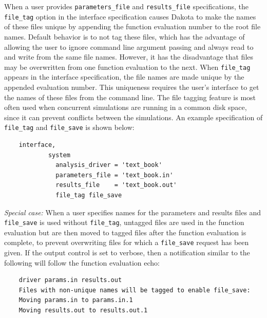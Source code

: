 When a user provides \texttt{parameters\_file} and
\texttt{results\_file} specifications, the \texttt{file\_tag} option
in the interface specification causes Dakota to make the names of
these files unique by appending the function
evaluation number to the root file names. Default behavior is to not
tag these files, which has the advantage of allowing the user to
ignore command line argument passing and always read to and write from
the same file names. However, it has the disadvantage that files may
be overwritten from one function evaluation to the next. When
\texttt{file\_tag} appears in the interface specification, the file names
are made unique by the appended evaluation number. This uniqueness
requires the user's interface to get the names of
these files from the command line. The file tagging feature is most
often used when concurrent simulations are running in a common disk
space, since it can prevent conflicts between the simulations. An
example specification of \texttt{file\_tag} and \texttt{file\_save} is
shown below:
\begin{small}
\begin{verbatim}
    interface,
            system
              analysis_driver = 'text_book'
              parameters_file = 'text_book.in'
              results_file    = 'text_book.out'
              file_tag file_save
\end{verbatim}
\end{small}

\emph{Special case:} When a user specifies names for the parameters
and results files and \texttt{file\_save} is used without
\texttt{file\_tag}, untagged files are used in the function evaluation
but are then moved to tagged files after the function evaluation is
complete, to prevent overwriting files for which a
\texttt{file\_save} request has been given. If the output control is
set to verbose, then a notification similar to the following will
follow the function evaluation echo:
\begin{small}
\begin{verbatim}
    driver params.in results.out
    Files with non-unique names will be tagged to enable file_save:
    Moving params.in to params.in.1
    Moving results.out to results.out.1
\end{verbatim}
\end{small}

